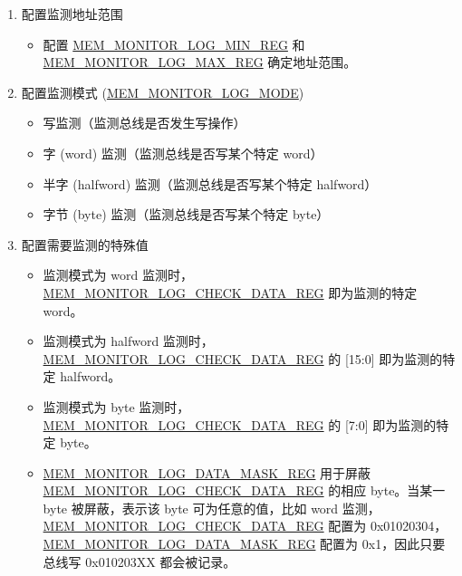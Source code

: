 \documentclass[main\_\_CN.tex]{subfiles}
\begin{document}
\begin{enumerate}
    \item 配置监测地址范围
        \begin{itemize}
            \item 配置 \hyperref[regdesc:MEMMONITORLOGMINREG]{MEM\_MONITOR\_LOG\_MIN\_REG} 和 \hyperref[regdesc:MEMMONITORLOGMAXREG]{MEM\_MONITOR\_LOG\_MAX\_REG} 确定地址范围。
        \end{itemize}
    \item 配置监测模式 (\hyperref[fielddesc:MEMMONITORLOGMODE]{MEM\_MONITOR\_LOG\_MODE})
       \begin{itemize}
            \item 写监测（监测总线是否发生写操作）
           \item 字 (word) 监测（监测总线是否写某个特定 word）
           \item 半字 (halfword) 监测（监测总线是否写某个特定 halfword）
           \item 字节 (byte) 监测（监测总线是否写某个特定 byte）
       \end{itemize}
    \item 配置需要监测的特殊值
        \begin{itemize}
            \item 监测模式为 word 监测时，\hyperref[regdesc:MEMMONITORLOGCHECKDATAREG]{MEM\_MONITOR\_LOG\_CHECK\_DATA\_REG} 即为监测的特定 word。
            \item 监测模式为 halfword 监测时，\hyperref[regdesc:MEMMONITORLOGCHECKDATAREG]{MEM\_MONITOR\_LOG\_CHECK\_DATA\_REG} 的 [15:0] 即为监测的特定 halfword。
            \item 监测模式为 byte 监测时，\hyperref[regdesc:MEMMONITORLOGCHECKDATAREG]{MEM\_MONITOR\_LOG\_CHECK\_DATA\_REG} 的 [7:0] 即为监测的特定 byte。
            \item \hyperref[regdesc:MEMMONITORLOGDATAMASKREG]{MEM\_MONITOR\_LOG\_DATA\_MASK\_REG} 用于屏蔽 \hyperref[regdesc:MEMMONITORLOGCHECKDATAREG]{MEM\_MONITOR\_LOG\_CHECK\_DATA\_REG} 的相应 byte。当某一 byte 被屏蔽，表示该 byte 可为任意的值，比如 word 监测，\hyperref[regdesc:MEMMONITORLOGCHECKDATAREG]{MEM\_MONITOR\_LOG\_CHECK\_DATA\_REG} 配置为 0x01020304，\hyperref[regdesc:MEMMONITORLOGDATAMASKREG]{MEM\_MONITOR\_LOG\_DATA\_MASK\_REG} 配置为 0x1，因此只要总线写 0x010203XX 都会被记录。
        \end{itemize}


\end{enumerate}
\end{document}
